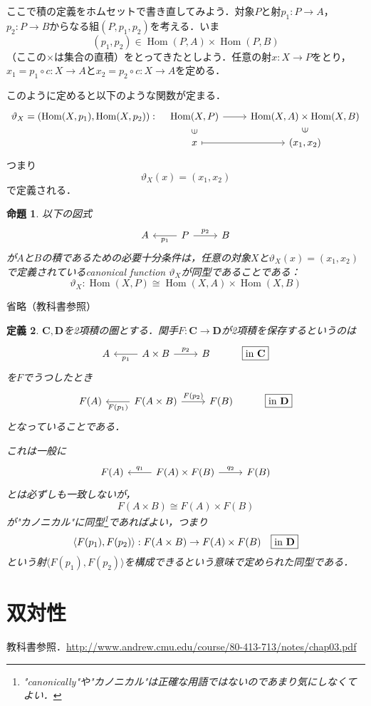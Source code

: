 \documentclass[dvipdfmx,a4j,10pt]{jsarticle}
\makeatletter
\theoremstyle{mystyle1}
\newtheorem{dfn}{定義}[section]
\newtheorem{prop}[dfn]{命題}
\theoremstyle{mystyle2}
\renewenvironment{proof}[1][\proofname]{\par
  \pushQED{\qed}%
  \normalfont
  \topsep6\p@\@plus6\p@ \trivlist
  \item[\hskip\labelsep{\bfseries\sffamily #1}]\ignorespaces
}{%
  \popQED\endtrivlist\@endpefalse
}
\renewcommand\proofname{証明}
\DeclareMathOperator{\Hom}{Hom}
\def\startpoint#1{
    {\hfill\rlap{{$\overline{\tt{#1}\ \downarrow\ }$}}}\vspace{-1.5\baselineskip}
}
\makeatother
\begin{document}
ここで積の定義をホムセットで書き直してみよう．対象$P$と射$p_1:P\to A$，$p_2:P\to B$からなる組$(P,p_1,p_2)$を考える．いま
\[
	(p_1,p_2)\in\Hom(P,A)\times \Hom(P,B)
\]
（ここの$\times$は集合の直積）をとってきたとしよう．任意の射$x:X\to P$をとり，$x_1=p_1\circ c:X\to A$と$x_2=p_2\circ c:X\to A$を定める．

このように定めると以下のような関数が定まる．
\[
	\begin{tikzcd}
		\vartheta_X=(\Hom(X,p_1),\Hom(X,p_2)): &[-4ex] \Hom(X,P) \arrow[r] \arrow[d,phantom,"\rotatebox{90}{$\in$}"] & \Hom(X,A)\times \Hom(X,B) \arrow[d,phantom,"\rotatebox{90}{$\in$}"] \\[-2ex]
		& x \arrow[r,mapsto] & (x_1,x_2)
	\end{tikzcd}
\]
つまり
\[
	\vartheta_X(x)=(x_1,x_2)
\]
で定義される．

\begin{prop}
	以下の図式
	\[
		\begin{tikzcd} A & P \arrow[l,"p_1"] \arrow[r,"p_2"] & B\end{tikzcd}
	\]
	が$A$と$B$の積であるための必要十分条件は，任意の対象$X$と$\vartheta_X(x)=(x_1,x_2)$で定義されているcanonical function $\vartheta_X$が同型であることである：
	\[
		\vartheta_X:\Hom(X,P)\cong \Hom(X,A)\times\Hom(X,B)
	\]
\end{prop}

\begin{proof}
	省略（教科書参照）
\end{proof}

\begin{dfn}
	$\mathbf{C},\mathbf{D}$を2項積の圏とする．関手$F:\mathbf{C}\to \mathbf{D}$が2項積を保存するというのは
	\[
		\begin{tikzcd}
			A & A\times B \arrow[l,"p_1"] \arrow[r,"p_2"] & B & \fbox{in $\mathbf{C}$}
		\end{tikzcd}
	\]
	を$F$でうつしたとき
	\[
		\begin{tikzcd}
			F(A) & F(A\times B) \arrow[l,"F(p_1)"] \arrow[r,"F(p_2)"] & F(B) & \fbox{in $\mathbf{D}$}
		\end{tikzcd}
	\]
	となっていることである．

	これは一般に
	\[
		\begin{tikzcd}
			F(A) & F(A)\times F(B) \arrow[l,"q_1"'] \arrow[r,"q_2"] & F(B)
		\end{tikzcd}
	\]
	とは必ずしも一致しないが，
	\[
		F(A\times B)\cong F(A)\times F(B)
	\]
	が"カノニカル"に同型\footnote{"canonically"や"カノニカル"は正確な用語ではないのであまり気にしなくてよい．}であればよい，つまり
	\[
		\langle F(p_1),F(p_2) \rangle :F(A\times B)\to F(A)\times F(B)\quad \fbox{in $\mathbf{D}$}
	\]
	という射$\langle F(p_1),F(p_2) \rangle$を構成できるという意味で定められた同型である．
\end{dfn}

\startpoint{6/21(第10回)}

\section{双対性}

教科書参照．\url{http://www.andrew.cmu.edu/course/80-413-713/notes/chap03.pdf}
\end{document}

